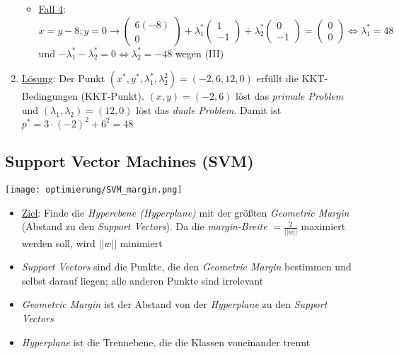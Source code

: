 \begin{enumerate}
\begin{itemize}
                \item \underline{Fall 4}: \(x=y-8; y=0 \rightarrow \begin{pmatrix}
                    6(-8)\\0
                    \end{pmatrix} + \lambda_1^* \begin{pmatrix}
                        1\\-1
                    \end{pmatrix} + \lambda_2^* \begin{pmatrix}
                        0\\-1
                    \end{pmatrix}
                     = \begin{pmatrix}
                        0\\0
                    \end{pmatrix}\Leftrightarrow \lambda_1^*=48\) und \(-\lambda_1^* - \lambda_2^* = 0 \Leftrightarrow \lambda_2^*=-48\) \Lightning \hspace{0.1em} wegen (III)
    

        \end{itemize} 
    \item \underline{Lösung}: Der Punkt \((x^*, y^*, \lambda_1^*, \lambda_2^2) = (-2, 6, 12, 0)\) erfüllt die KKT-Bedingungen (KKT-Punkt). \((x, y)=(-2,6)\) löst das \emph{primale Problem} und \((\lambda_1, \lambda_2)=(12,0)\) löst das \emph{duale Problem}. Damit ist \(p^*=3\cdot (-2)^2+6^2=48\)\\
\end{enumerate}


\subsection{Support Vector Machines (SVM)}

\begin{minipage}{0.4\textwidth}
    \texttt{[image: optimierung/SVM\_margin.png]}
\end{minipage}
\hfill
\begin{minipage}{0.5\textwidth}
    \begin{itemize}
        \item \underline{Ziel}: Finde die \emph{Hyperebene (Hyperplane)} mit der größten \emph{Geometric Margin} (Abstand zu den \emph{Support Vectors}). Da die \emph{margin-Breite} \(=\frac{2}{||w||}\) maximiert werden soll, wird \(||w||\) minimiert
        \item \emph{Support Vectors} sind die Punkte, die den \emph{Geometric Margin} bestimmen und selbst darauf liegen; alle anderen Punkte sind irrelevant
        \item \emph{Geometric Margin} ist der Abstand von der \emph{Hyperplane} zu den \emph{Support Vectors}
        \item \emph{Hyperplane} ist die Trennebene, die die Klassen voneinander trennt
    \end{itemize}
\end{minipage}
